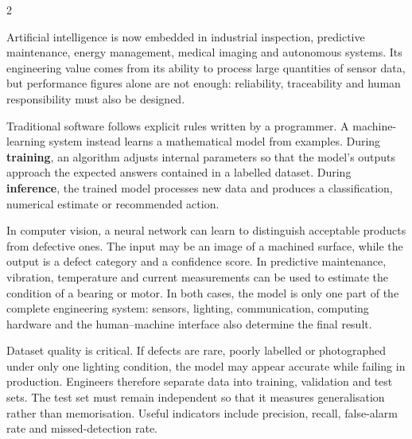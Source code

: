 

\begin{multicols}{2}
\begin{engineeringnews}
Artificial intelligence is now embedded in industrial inspection, predictive maintenance, energy management, medical imaging and autonomous systems. Its engineering value comes from its ability to process large quantities of sensor data, but performance figures alone are not enough: reliability, traceability and human responsibility must also be designed.
\end{engineeringnews}

\begin{ecarticle}
Traditional software follows explicit rules written by a programmer. A machine-learning system instead learns a mathematical model from examples. During \textbf{training}, an algorithm adjusts internal parameters so that the model's outputs approach the expected answers contained in a labelled dataset. During \textbf{inference}, the trained model processes new data and produces a classification, numerical estimate or recommended action.

In computer vision, a neural network can learn to distinguish acceptable products from defective ones. The input may be an image of a machined surface, while the output is a defect category and a confidence score. In predictive maintenance, vibration, temperature and current measurements can be used to estimate the condition of a bearing or motor. In both cases, the model is only one part of the complete engineering system: sensors, lighting, communication, computing hardware and the human--machine interface also determine the final result.

Dataset quality is critical. If defects are rare, poorly labelled or photographed under only one lighting condition, the model may appear accurate while failing in production. Engineers therefore separate data into training, validation and test sets. The test set must remain independent so that it measures generalisation rather than memorisation. Useful indicators include precision, recall, false-alarm rate and missed-detection rate.


\end{ecarticle}
\end{multicols}
